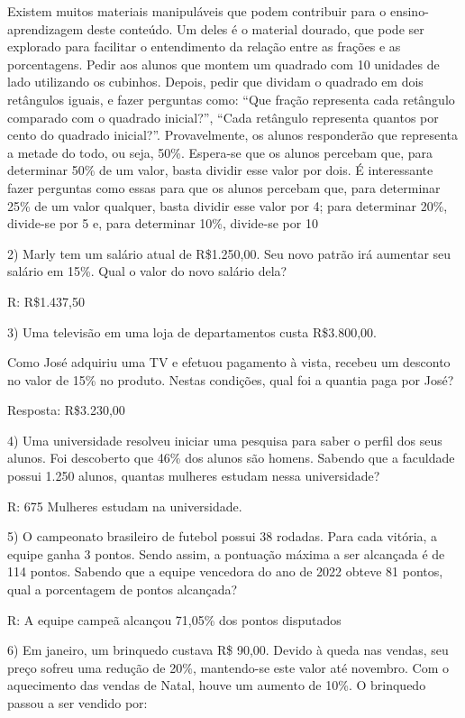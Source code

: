 Existem muitos materiais manipuláveis que podem contribuir para o
ensino-aprendizagem deste conteúdo. Um deles é o material dourado, que
pode ser explorado para facilitar o entendimento da relação entre as
frações e as porcentagens. Pedir aos alunos que montem um quadrado com
10 unidades de lado utilizando os cubinhos. Depois, pedir que dividam o
quadrado em dois retângulos iguais, e fazer perguntas como: ``Que fração
representa cada retângulo comparado com o quadrado inicial?'', ``Cada
retângulo representa quantos por cento do quadrado inicial?''.
Provavelmente, os alunos responderão que representa a metade do todo, ou
seja, 50\%. Espera-se que os alunos percebam que, para determinar 50\%
de um valor, basta dividir esse valor por dois. É interessante fazer
perguntas como essas para que os alunos percebam que, para determinar
25\% de um valor qualquer, basta dividir esse valor por 4; para
determinar 20\%, divide-se por 5 e, para determinar 10\%, divide-se por
10

2) Marly tem um salário atual de R\$1.250,00. Seu novo patrão irá
aumentar seu salário em 15\%. Qual o valor do novo salário dela?

R: R\$1.437,50

3) Uma televisão em uma loja de departamentos custa R\$3.800,00.

Como José adquiriu uma TV e efetuou pagamento à vista, recebeu um
desconto no valor de 15\% no produto. Nestas condições, qual foi a
quantia paga por José?

Resposta: R\$3.230,00

4) Uma universidade resolveu iniciar uma pesquisa para saber o perfil
dos seus alunos. Foi descoberto que 46\% dos alunos são homens. Sabendo
que a faculdade possui 1.250 alunos, quantas mulheres estudam nessa
universidade?

R: 675 Mulheres estudam na universidade.

5) O campeonato brasileiro de futebol possui 38 rodadas. Para cada
vitória, a equipe ganha 3 pontos. Sendo assim, a pontuação máxima a ser
alcançada é de 114 pontos. Sabendo que a equipe vencedora do ano de 2022
obteve 81 pontos, qual a porcentagem de pontos alcançada?

R: A equipe campeã alcançou 71,05\% dos pontos disputados

6) Em janeiro, um brinquedo custava R\$ 90,00. Devido à queda nas
vendas, seu preço sofreu uma redução de 20\%, mantendo-se este valor até
novembro. Com o aquecimento das vendas de Natal, houve um aumento de
10\%. O brinquedo passou a ser vendido por:

